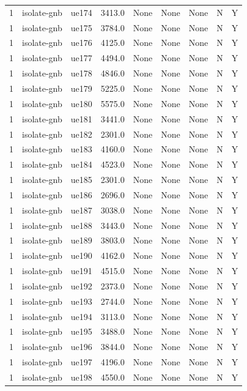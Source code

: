 \begin{table}[ht]
\begin{tabular}{|c|c|c|c|c|c|c|c|c|}
1 & isolate-gnb & ue174 & 3413.0 & None & None & None & N & Y \\
1 & isolate-gnb & ue175 & 3784.0 & None & None & None & N & Y \\
1 & isolate-gnb & ue176 & 4125.0 & None & None & None & N & Y \\
1 & isolate-gnb & ue177 & 4494.0 & None & None & None & N & Y \\
1 & isolate-gnb & ue178 & 4846.0 & None & None & None & N & Y \\
1 & isolate-gnb & ue179 & 5225.0 & None & None & None & N & Y \\
1 & isolate-gnb & ue180 & 5575.0 & None & None & None & N & Y \\
1 & isolate-gnb & ue181 & 3441.0 & None & None & None & N & Y \\
1 & isolate-gnb & ue182 & 2301.0 & None & None & None & N & Y \\
1 & isolate-gnb & ue183 & 4160.0 & None & None & None & N & Y \\
1 & isolate-gnb & ue184 & 4523.0 & None & None & None & N & Y \\
1 & isolate-gnb & ue185 & 2301.0 & None & None & None & N & Y \\
1 & isolate-gnb & ue186 & 2696.0 & None & None & None & N & Y \\
1 & isolate-gnb & ue187 & 3038.0 & None & None & None & N & Y \\
1 & isolate-gnb & ue188 & 3443.0 & None & None & None & N & Y \\
1 & isolate-gnb & ue189 & 3803.0 & None & None & None & N & Y \\
1 & isolate-gnb & ue190 & 4162.0 & None & None & None & N & Y \\
1 & isolate-gnb & ue191 & 4515.0 & None & None & None & N & Y \\
1 & isolate-gnb & ue192 & 2373.0 & None & None & None & N & Y \\
1 & isolate-gnb & ue193 & 2744.0 & None & None & None & N & Y \\
1 & isolate-gnb & ue194 & 3113.0 & None & None & None & N & Y \\
1 & isolate-gnb & ue195 & 3488.0 & None & None & None & N & Y \\
1 & isolate-gnb & ue196 & 3844.0 & None & None & None & N & Y \\
1 & isolate-gnb & ue197 & 4196.0 & None & None & None & N & Y \\
1 & isolate-gnb & ue198 & 4550.0 & None & None & None & N & Y \\

\end{tabular}
\end{table}

